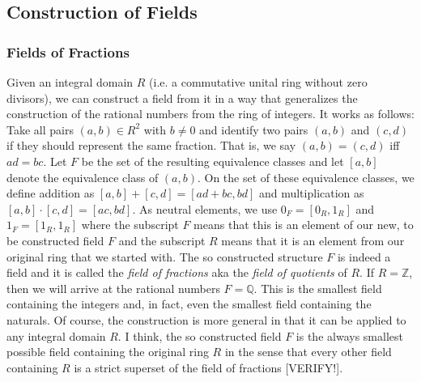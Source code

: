

\subsection{Construction of Fields}


\subsubsection{Fields of Fractions}
Given an integral domain $R$ (i.e. a commutative unital ring without zero divisors), we can construct a field from it in a way that generalizes the construction of the rational numbers from the ring of integers. It works as follows: Take all pairs $(a,b) \in R^2$ with $b \neq 0$ and identify two pairs $(a,b)$ and $(c,d)$ if they should represent the same fraction. That is, we say $(a,b) = (c,d)$ iff $a d = b c$. Let $F$ be the set of the resulting equivalence classes and let $[a,b]$ denote the equivalence class of $(a,b)$. On the set of these equivalence classes, we define addition as $[a,b] + [c,d] = [a d + bc, bd]$ and multiplication as  $[a,b] \cdot [c,d] = [ac, bd]$. As neutral elements, we use $0_F = [0_R, 1_R]$ and $1_F = [1_R, 1_R]$ where the subscript $F$ means that this is an element of our new, to be constructed field $F$ and the subscript $R$ means that it is an element from our original ring that we started with. The so constructed structure $F$ is indeed a field and it is called the \emph{field of fractions} aka the \emph{field of quotients} of $R$. If $R = \mathbb{Z}$, then we will arrive at the rational numbers $F = \mathbb{Q}$. This is the smallest field containing the integers and, in fact, even the smallest field containing the naturals. Of course, the construction is more general in that it can be applied to any integral domain $R$. I think, the so constructed field $F$ is the always smallest possible field containing the original ring $R$ in the sense that every other field containing $R$ is a strict superset of the field of fractions [VERIFY!]. 


